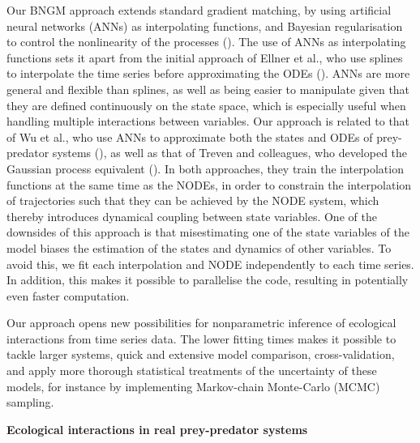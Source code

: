 \documentclass[11pt, oneside]{article}
\begin{document}
Our BNGM approach extends standard gradient matching, by using artificial neural networks (ANNs) as interpolating functions, and Bayesian regularisation to control the nonlinearity of the processes (\cite{Cawley2007}).
The use of ANNs as interpolating functions sets it apart from the initial approach of Ellner et al., who use splines to interpolate the time series before approximating the ODEs (\cite{Ellner2002}).
ANNs are more general and flexible than splines, as well as being easier to manipulate given that they are defined continuously on the state space, which is especially useful when handling multiple interactions between variables.
Our approach is related to that of Wu et al., who use ANNs to approximate both the states and ODEs of prey-predator systems (\cite{Wu2005}), as well as that of Treven and colleagues, who developed the Gaussian process equivalent (\cite{Treven2021}).
In both approaches, they train the interpolation functions at the same time as the NODEs, in order to constrain the interpolation of trajectories such that they can be achieved by the NODE system, which thereby introduces dynamical coupling between state variables.
One of the downsides of this approach is that misestimating one of the state variables of the model biases the estimation of the states and dynamics of other variables.
To avoid this, we fit each interpolation and NODE independently to each time series.
In addition, this makes it possible to parallelise the code, resulting in potentially even faster computation.

Our approach opens new possibilities for nonparametric inference of ecological interactions from time series data.
The lower fitting times makes it possible to tackle larger systems, quick and extensive model comparison, cross-validation, and apply more thorough statistical treatments of the uncertainty of these models, for instance by implementing Markov-chain Monte-Carlo (MCMC) sampling.

\textbf{Ecological interactions in real prey-predator systems}
\end{document}

